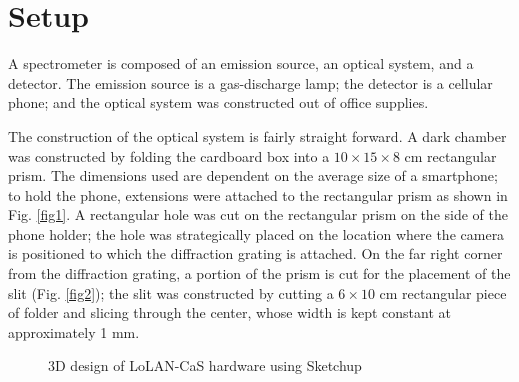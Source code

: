 \documentclass[12pt,a4paper,twoside]{article}
\begin{document}
\section{Setup}\label{sec:setup}\medskip

A spectrometer is composed of an emission source, an optical system, and a detector. The emission source is a gas-discharge lamp; the detector is a cellular phone; and the optical system was constructed out of office supplies. 

The construction of the optical system is fairly straight forward. A dark chamber was constructed by folding the cardboard box into a $10 \times 15 \times 8$ cm rectangular prism. The dimensions used are dependent on the average size of a smartphone; to hold the phone, extensions were attached to the rectangular prism as shown in Fig. \ref{fig1}. A rectangular hole was cut on the rectangular prism on the side of the phone holder; the hole was strategically placed on the location where the camera is positioned to which the diffraction grating is attached. On the far right corner from the diffraction grating, a portion of the prism is cut for the placement of the slit (Fig. \ref{fig2}); the slit was constructed by cutting a $6 \times 10$ cm rectangular piece of folder and slicing through the center, whose width is kept constant at approximately 1 mm. 

\begin{figure}[h!]
	\centering
	\caption{3D design of LoLAN-CaS hardware using Sketchup}\label{figg1}
\end{figure}
\end{document}
